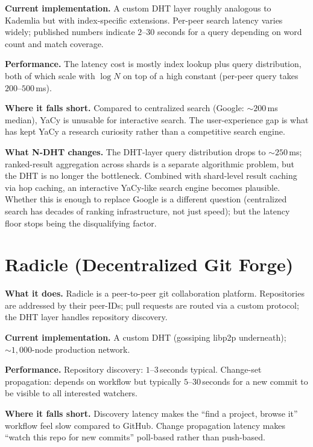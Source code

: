 \documentclass[twoside,nobib]{tufte-book}
\newcommand{\NDHT}{N-DHT\xspace}
\begin{document}
\textbf{Current implementation.} A custom DHT layer roughly
analogous to Kademlia but with index-specific extensions. Per-peer
search latency varies widely; published numbers indicate
$2$--$30$ seconds for a query depending on word count and
match coverage.

\textbf{Performance.} The latency cost is mostly index lookup
plus query distribution, both of which scale with $\log N$ on
top of a high constant (per-peer query takes $200$--$500$\,ms).

\textbf{Where it falls short.} Compared to centralized search
(Google: $\sim 200$\,ms median), YaCy is unusable for
interactive search. The user-experience gap is what has kept
YaCy a research curiosity rather than a competitive search
engine.

\textbf{What \NDHT changes.} The DHT-layer query distribution
drops to $\sim 250$\,ms; ranked-result aggregation across
shards is a separate algorithmic problem, but the DHT is no
longer the bottleneck. Combined with shard-level result caching
via hop caching, an interactive YaCy-like search engine becomes
plausible. Whether this is enough to replace Google is a
different question (centralized search has decades of ranking
infrastructure, not just speed); but the latency floor stops
being the disqualifying factor.

\section{Radicle (Decentralized Git Forge)}

\textbf{What it does.} Radicle is a peer-to-peer git
collaboration platform. Repositories are addressed by their
peer-IDs; pull requests are routed via a custom protocol; the
DHT layer handles repository discovery.

\textbf{Current implementation.} A custom DHT (gossiping libp2p
underneath); $\sim 1{,}000$-node production network.

\textbf{Performance.} Repository discovery: $1$--$3$\,seconds
typical. Change-set propagation: depends on workflow but
typically $5$--$30$\,seconds for a new commit to be visible
to all interested watchers.

\textbf{Where it falls short.} Discovery latency makes the
``find a project, browse it'' workflow feel slow compared to
GitHub. Change propagation latency makes ``watch this repo for
new commits'' poll-based rather than push-based.
\end{document}
